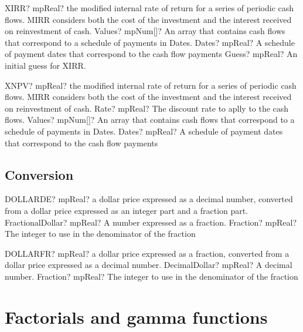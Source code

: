 \documentclass[12pt,a4paper,openany]{book}
\begin{document}
\begin{mpFunctionsExtract}
\mpWorksheetFunctionThreeNotImplemented
{XIRR? mpReal? the modified internal rate of return for a series of periodic cash flows. MIRR considers both the cost of the investment and the interest received on reinvestment of cash.}
{Values? mpNum[]? An array that contains cash flows that correspond to a schedule of payments in Dates.}
{Dates? mpReal? A schedule of payment dates that correspond to the cash flow payments}
{Guess? mpReal? An initial guess for XIRR.}
\end{mpFunctionsExtract}

\begin{mpFunctionsExtract}
\mpWorksheetFunctionThreeNotImplemented
{XNPV? mpReal? the modified internal rate of return for a series of periodic cash flows. MIRR considers both the cost of the investment and the interest received on reinvestment of cash.}
{Rate? mpReal? The discount rate to aplly to the cash flows.}
{Values? mpNum[]? An array that contains cash flows that correspond to a schedule of payments in Dates.}
{Dates? mpReal? A schedule of payment dates that correspond to the cash flow payments}
\end{mpFunctionsExtract}

\section{Conversion}

\begin{mpFunctionsExtract}
\mpWorksheetFunctionTwoNotImplemented
{DOLLARDE? mpReal? a dollar price expressed as a decimal number, converted from a dollar price expressed as an integer part and a fraction part.}
{FractionalDollar? mpReal? A number expressed as a fraction.}
{Fraction? mpReal? The integer to use in the denominator of the fraction}
\end{mpFunctionsExtract}

\begin{mpFunctionsExtract}
\mpWorksheetFunctionTwoNotImplemented
{DOLLARFR? mpReal?  a dollar price expressed as a fraction, converted from a dollar price expressed as a decimal number.}
{DecimalDollar? mpReal? A decimal number.}
{Fraction? mpReal? The integer to use in the denominator of the fraction}
\end{mpFunctionsExtract}

\chapter{Factorials and gamma functions}
\end{document}
